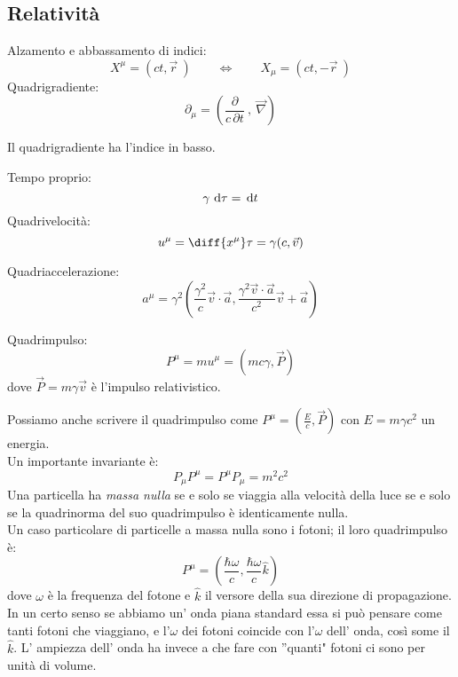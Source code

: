 \documentclass[a4paper,10pt,oneside]{math_article}
\newcommand{\grad}{\vec{\nabla}}
\begin{document}
		\subsection{Relatività}
			Alzamento e abbassamento di indici:
			\[
				X^\mu=\left(ct,\vec r\ \right)\qquad \Longleftrightarrow\qquad X_\mu=\left(ct,-\vec r\ \right)
			\]
			Quadrigradiente:
			\[
				\partial_\mu =\left(\frac{\partial}{c\, \partial t}\ ,\ \grad\right)
			\]
			\begin{Achtung}
					Il quadrigradiente ha l'indice in basso.		
			\end{Achtung}
			Tempo proprio:
			\begin{equation}
				\gamma\, \, \textrm{d} \tau=\, \textrm{d} t
			\end{equation}						
			Quadrivelocità:
			\begin{equation}
				u^\mu = \diff{x^\mu}\tau = \gamma(c, \vec v)
			\end{equation}

			Quadriaccelerazione:
			\begin{equation}
				a^\mu = \gamma^2\left( \frac{\gamma^2}c \vec v \cdot \vec a, \frac{\gamma^2\vec v \cdot \vec a}{c^2} \vec v + \vec a\right)
			\end{equation}
						
			Quadrimpulso:
			\begin{equation}
				P^\mu = mu^\mu = (mc\gamma, \vec P)
			\end{equation}
			dove $\vec P = m\gamma \vec v$ è l'impulso relativistico.
			
			Possiamo anche scrivere il quadrimpulso come $P^\mu = (\frac Ec, \vec P)$ con $E=m\gamma c^2$ un energia.\\
			Un importante invariante è:
			\[
				P_\mu P^\mu=P^\mu P_\mu=m^2 c^2
			\]
			Una particella ha {\it massa nulla} se e solo se viaggia alla velocità della luce se e solo se la quadrinorma del suo quadrimpulso è identicamente nulla.\\
			Un caso particolare di particelle a massa nulla sono i fotoni; il loro quadrimpulso è:
			\[	
				P^\mu=\left(\frac{\hbar \omega}{c},\frac{\hbar \omega}{c}\hat k\right)
			\]
			dove $\omega$ è la frequenza del fotone e $\hat k$ il versore della sua direzione di propagazione.
			In un certo senso se abbiamo un' onda piana standard essa si può pensare come tanti fotoni che viaggiano, e l'$\omega$ dei fotoni coincide con l'$\omega$ dell' onda, così some il $\hat k$. L' ampiezza dell' onda ha invece a che fare con ''quanti" fotoni ci sono per unità di volume.




	
\end{document}

